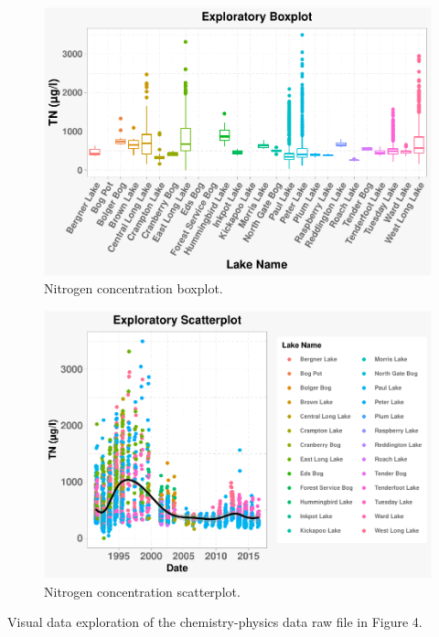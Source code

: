 \documentclass[12pt,]{article}
\begin{document}
\begin{figure}
\centering
\includegraphics{Eadala_ENV872_Project_files/figure-latex/fig2-1.pdf}
\caption{Nitrogen concentration boxplot.}
\end{figure}

\begin{figure}
\centering
\includegraphics{Eadala_ENV872_Project_files/figure-latex/fig3-1.pdf}
\caption{Nitrogen concentration scatterplot.}
\end{figure}

Visual data exploration of the chemistry-physics data raw file in Figure
4.
\end{document}
